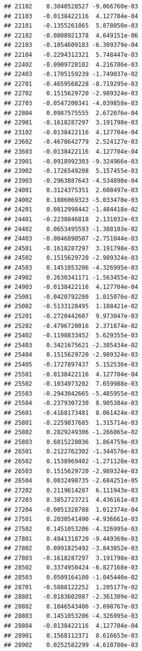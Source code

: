 \begin{frame}[fragile]
\begin{verbatim}
## 21102    0.3040528527 -9.066760e-03
## 21103   -0.0138422116  4.127704e-04
## 22101   -0.1355261865  5.878050e-03
## 22102   -0.0808921378  4.649151e-06
## 22103   -0.1054609183 -6.309379e-04
## 22104   -0.2294312321  5.748447e-03
## 22402   -0.0909728102  4.216786e-03
## 22403   -0.1705159239 -1.749037e-02
## 22701   -0.4659568228 -8.719295e-03
## 22702    0.1515629720 -2.989324e-03
## 22703   -0.0547200341 -4.039858e-03
## 22804    0.0987575555  2.672076e-04
## 22901   -0.1618287297  3.191798e-03
## 23102   -0.0138422116  4.127704e-04
## 23602   -0.4678642779  2.524127e-03
## 23603   -0.0138422116  4.127704e-04
## 23901   -0.0918992303 -9.324966e-03
## 23902   -0.1726549208  5.157455e-03
## 23903   -0.2963887643 -4.534890e-04
## 24001    0.3124375351  2.608497e-03
## 24002    0.1886069323 -5.033470e-03
## 24201    0.0812998442 -1.484418e-02
## 24401   -0.2238846818  2.131032e-03
## 24402    0.0653495593 -1.388103e-02
## 24403   -0.0046890507 -2.751044e-03
## 24501   -0.1618287297  3.191798e-03
## 24502    0.1515629720 -2.989324e-03
## 24503    0.1451053206 -4.326995e-03
## 24902    0.2630341171 -1.563455e-02
## 24903   -0.0138422116  4.127704e-04
## 25001   -0.0420792280  1.015076e-02
## 25002   -0.5133128495  1.188421e-02
## 25201   -0.2720442607  9.973047e-03
## 25202   -0.4796720016  2.371874e-02
## 25402   -0.1198833452  5.629355e-03
## 25403    0.3421675621 -2.385434e-02
## 25404    0.1515629720 -2.989324e-03
## 25405   -0.1727897437  5.152536e-03
## 25501   -0.0138422116  4.127704e-04
## 25502   -0.1034973202  7.659988e-03
## 25503   -0.2943042665 -5.485955e-03
## 25504   -0.2379307230  8.905384e-03
## 25601   -0.4168173481  8.061424e-03
## 25801   -0.2259837685  1.315714e-03
## 25802    0.2829249306 -1.266065e-02
## 25803    0.6015228036  1.864759e-03
## 26501    0.2122762302 -1.344576e-03
## 26502    0.1538969402 -1.271120e-03
## 26503    0.1515629720 -2.989324e-03
## 26504    0.0032498735 -2.684251e-05
## 27202    0.2119614287  6.111943e-03
## 27203    0.3852723721  4.436161e-03
## 27204   -0.0051328788  1.012374e-04
## 27501    0.2030541490 -4.936661e-03
## 27502    0.1451053206 -4.326995e-03
## 27801    0.4941318720 -9.449369e-03
## 27802    0.0991825492 -3.843852e-03
## 27803   -0.1618287297  3.191798e-03
## 28502    0.3374950424 -6.827168e-03
## 28503    0.0509164100 -1.045440e-02
## 28701   -0.5888122252  1.205177e-02
## 28801   -0.0183602087 -2.361309e-02
## 28802    0.1046543406 -3.698767e-03
## 28803    0.1451053206 -4.326995e-03
## 28804   -0.0138422116  4.127704e-04
## 28901    0.1568112371  8.616653e-03
## 28902    0.0252582299 -4.610700e-03

\end{verbatim}
\end{frame}
